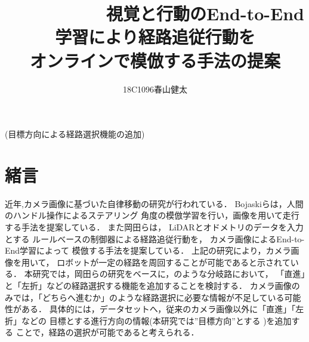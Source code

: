 \documentclass[10pt]{jarticle}
\begin{document}
    
    \makeatletter
  \title{　　　　　　視覚と行動のEnd-to-End学習により経路追従行動を　　　　　　オンラインで模倣する手法の提案}
        {(目標方向による経路選択機能の追加)}
    
    \author{18C1096\hspace{.5zw}春山健太}
    
    \makeatother
    
    
    \maketitle
    
    
    \section{緒\hspace{2zw}言}%
    近年,カメラ画像に基づいた自律移動の研究が行われている．%
    Bojaskiら\cite{nvidia}は，人間のハンドル操作によるステアリング
    角度の模倣学習を行い，画像を用いて走行する手法を提案している．
    また岡田ら\cite{okada}は，
    LiDARとオドメトリのデータを入力とする
    ルールべースの制御器による経路追従行動を，
    カメラ画像によるEnd-to-End学習によって
    模倣する手法を提案している．
    上記の研究により，カメラ画像を用いて，
    ロボットが一定の経路を周回することが可能であると示されている．
    本研究では，岡田らの研究をベースに，のような分岐路において，
    「直進」と「左折」などの経路選択する機能を追加することを検討する．
    カメラ画像のみでは，「どちらへ進むか」のような経路選択に必要な情報が不足している可能性がある．
    具体的には，データセットへ，従来のカメラ画像以外に「直進」「左折」などの
    目標とする進行方向の情報(本研究では”目標方向”とする )を追加する
    ことで，経路の選択が可能であると考えられる．
\end{document}
